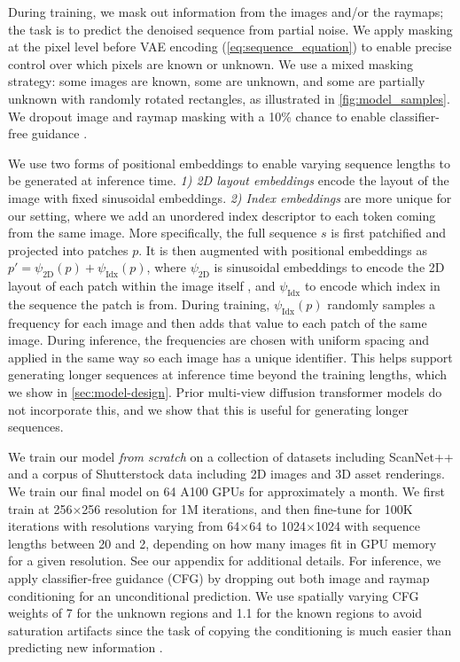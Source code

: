%
During training, we mask out information from the images and/or the raymaps; the task is to predict the denoised sequence from partial noise.
We apply masking at the pixel level before VAE encoding (\cref{eq:sequence_equation}) to enable precise control over which pixels are known or unknown.
We use a mixed masking strategy: some images are known, some are unknown, and some are partially unknown with randomly rotated rectangles, as illustrated in \cref{fig:model_samples}.
We dropout image and raymap masking with a 10\% chance to enable classifier-free guidance \cite{ho2022classifier}.

%
We use two forms of positional embeddings to enable varying sequence lengths to be generated at inference time.
\textit{1) 2D layout embeddings} encode the layout of the image with fixed sinusoidal embeddings.
\textit{2) Index embeddings} are more unique for our setting, where we add an unordered index descriptor to each token coming from the same image.
More specifically, the full sequence $s$ is first patchified and projected into patches $p$.
It is then augmented with positional embeddings as $p' = \psi_\text{2D}(p) + \psi_\text{Idx}(p)$, where $\psi_\text{2D}$ is sinusoidal embeddings to encode the 2D layout of each patch within the image itself \cite{vaswani2017attention}, and $\psi_\text{Idx}$ to encode which index in the sequence the patch is from.
During training, $\psi_\text{Idx}(p)$ randomly samples a frequency for each image and then adds that value to each patch of the same image.
During inference, the frequencies are chosen with uniform spacing and applied in the same way so each image has a unique identifier.
This helps support generating longer sequences at inference time beyond the training lengths, which we show in \cref{sec:model-design}.
Prior multi-view diffusion transformer models do not incorporate this, and we show that this is useful for generating longer sequences.

%
We train our model \textit{from scratch} on a collection of datasets including
ScanNet++ \cite{yeshwanth2023scannet++}
and a corpus of Shutterstock data including 2D images and 3D asset renderings.
We train our final model on 64 A100 GPUs for approximately a month.
We first train at 256$\times$256 resolution for 1M iterations, and then fine-tune for 100K iterations with resolutions varying from 64$\times$64 to 1024$\times$1024 with sequence lengths between 20 and 2, depending on how many images fit in GPU memory for a given resolution.
See our appendix for additional details.
For inference, we apply classifier-free guidance (CFG) by dropping out both image and raymap conditioning for an unconditional prediction.
We use spatially varying CFG weights of 7 for the unknown regions and 1.1 for the known regions to avoid saturation artifacts since the task of copying the conditioning is much easier than predicting new information \cite{blattmann2023stable}.


